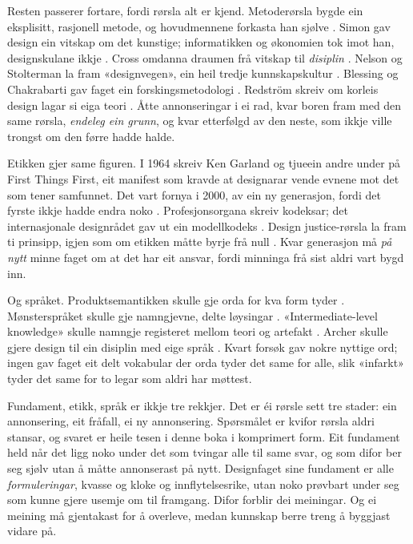 Resten passerer fortare, fordi rørsla alt er kjend. Metoderørsla bygde ein eksplisitt, rasjonell metode, og hovudmennene forkasta han sjølve \autocite{jones1970methods, alexander1964notes}. Simon gav design ein vitskap om det kunstige; informatikken og økonomien tok imot han, designskulane ikkje \autocite{simon1969sciences}. Cross omdanna draumen frå vitskap til \emph{disiplin} \autocite{cross2001discipline, cross2006}. Nelson og Stolterman la fram «designvegen», ein heil tredje kunnskapskultur \autocite{nelson2012designway}. Blessing og Chakrabarti gav faget ein forskingsmetodologi \autocite{blessing2009drm}. Redström skreiv om korleis design lagar si eiga teori \autocite{redstrom2017making}. Åtte annonseringar i ei rad, kvar boren fram med den same rørsla, \emph{endeleg ein grunn}, og kvar etterfølgd av den neste, som ikkje ville trongst om den førre hadde halde.

Etikken gjer same figuren. I 1964 skreiv Ken Garland og tjueein andre under på First Things First, eit manifest som kravde at designarar vende evnene mot det som tener samfunnet. Det vart fornya i 2000, av ein ny generasjon, fordi det fyrste ikkje hadde endra noko \autocite{firstthings2000}. Profesjonsorgana skreiv kodeksar; det internasjonale designrådet gav ut ein modellkodeks \autocite{icod_code}. Design justice-rørsla la fram ti prinsipp, igjen som om etikken måtte byrje frå null \autocite{costanzachock2020}. Kvar generasjon må \emph{på nytt} minne faget om at det har eit ansvar, fordi minninga frå sist aldri vart bygd inn.

Og språket. Produktsemantikken skulle gje orda for kva form tyder \autocite{krippendorff1984semantics}. Mønsterspråket skulle gje namngjevne, delte løysingar \autocite{alexander1977pattern}. «Intermediate-level knowledge» skulle namngje registeret mellom teori og artefakt \autocite{lowgren2013intermediate}. Archer skulle gjere design til ein disiplin med eige språk \autocite{archer1979discipline}. Kvart forsøk gav nokre nyttige ord; ingen gav faget eit delt vokabular der orda tyder det same for alle, slik «infarkt» tyder det same for to legar som aldri har møttest.

Fundament, etikk, språk er ikkje tre rekkjer. Det er éi rørsle sett tre stader: ein annonsering, eit fråfall, ei ny annonsering. Spørsmålet er kvifor rørsla aldri stansar, og svaret er heile tesen i denne boka i komprimert form. Eit fundament held når det ligg noko under det som tvingar alle til same svar, og som difor ber seg sjølv utan å måtte annonserast på nytt. Designfaget sine fundament er alle \emph{formuleringar}, kvasse og kloke og innflytelsesrike, utan noko prøvbart under seg som kunne gjere usemje om til framgang. Difor forblir dei meiningar. Og ei meining må gjentakast for å overleve, medan kunnskap berre treng å byggjast vidare på.


